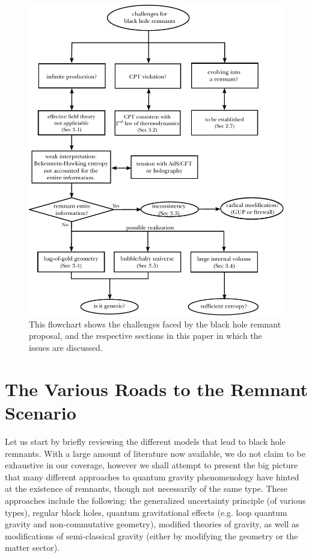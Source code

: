 \documentclass[12pt]{article}
\newcommand{\2}{$^2$}
\newcommand{\3}{$^3$}
\newcommand{\4}{$_4$}
\newcommand{\5}{$_5$}
\begin{document}
\begin{figure}
\begin{center}
\includegraphics[scale=0.72]{flowchart_2.pdf}
\caption{\label{flowchart2} This flowchart shows the challenges faced by the black hole remnant proposal, and the respective sections in this paper in which the issues are discussed.}
\end{center}
\end{figure}



\section{The Various Roads to the Remnant Scenario}

Let us start by briefly reviewing the different models that lead to black hole remnants. With a large amount of literature now available, we do not claim to be exhaustive in our coverage, however we shall attempt to present the big picture that many different approaches to quantum gravity phenomenology have hinted at the existence of remnants, though not necessarily of the same type. These approaches include the following: the generalized uncertainty principle (of various types), regular black holes, quantum gravitational effects (e.g. loop quantum gravity and non-commutative geometry), modified theories of gravity, as well as modifications of semi-classical gravity (either by modifying the geometry or the matter sector). 
\end{document}
